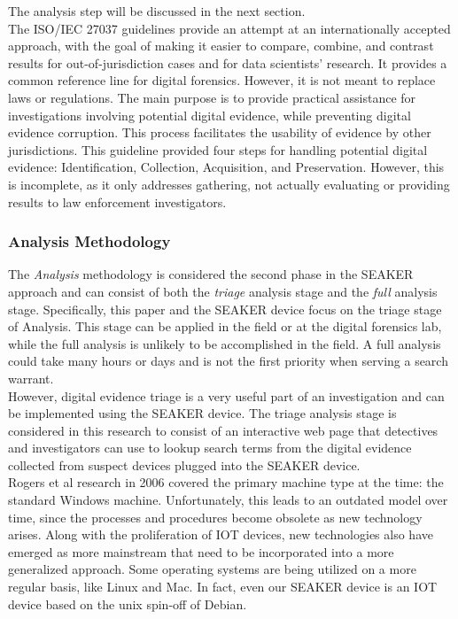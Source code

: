 \documentclass[12pt]{article}
\begin{document}
The analysis step will be discussed in the next section.\\

The ISO/IEC 27037 guidelines provide an attempt at an internationally accepted approach,
with the goal of making it easier to compare, combine, and contrast
results for out-of-jurisdiction cases and for data scientists' research.  It provides a
common reference line for 
digital forensics\cite{ajijola2014review}.  However, it is not meant to replace laws or regulations.
The main purpose is to provide practical
assistance for investigations involving potential digital evidence, while preventing digital
evidence corruption.  This
process facilitates the usability of evidence by other jurisdictions.  This guideline provided
four steps for handling
potential digital evidence: Identification, Collection, Acquisition, and Preservation.  However,
this is incomplete, as
it only addresses gathering, not actually evaluating or providing results to law enforcement
investigators.\\

\subsubsection{Analysis Methodology}

The {\em Analysis} methodology is considered the second phase in the SEAKER approach and 
can consist of both the {\em triage} analysis stage and the {\em full} analysis stage.
Specifically, this paper and the SEAKER device focus on the triage stage of Analysis.  This
stage can be applied in the field or at the digital forensics lab, while the full analysis
is unlikely to be accomplished in the field.  A full analysis could take many hours or days
and is not the first priority when serving a search warrant.\\

However, digital evidence triage is a very useful part of an investigation and can be 
implemented using the SEAKER device.  The triage analysis stage is considered in this research
to consist of an interactive web page that detectives and investigators can use to 
lookup search terms from the digital evidence collected from suspect devices plugged into the
SEAKER device.\\

Rogers et al\cite{rogers2006computer} research in 2006 covered the primary machine type at
the time: the standard Windows machine.  Unfortunately, this leads to an outdated model over
time, since the processes and procedures become obsolete as new technology arises.  Along with
the proliferation of IOT devices, new technologies also have emerged as more mainstream that
need to be incorporated into a more generalized approach.  Some operating systems are being
utilized on a more regular basis, like Linux and Mac.  In fact, even our SEAKER device is
an IOT device based on the unix spin-off of Debian.\\
\end{document}
